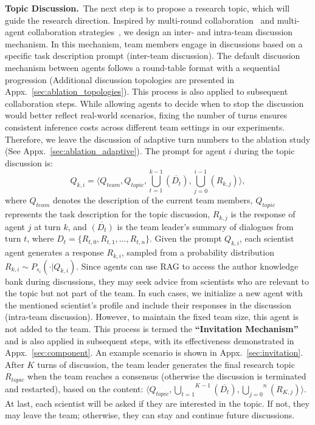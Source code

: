 \documentclass[11pt]{article}
\begin{document}
\noindent \textbf{Topic Discussion.}~The next step is to propose a research topic, which will guide the research direction. Inspired by multi-round collaboration~\citep{mezirow2003critical,sunstein2005societies,amgoud2009using} and multi-agent collaboration strategies~\citep{xu2023magic,zhang2023exploring,shinn2024reflexion}, we design an inter- and intra-team discussion mechanism. In this mechanism, team members engage in discussions based on a specific task description prompt (inter-team discussion). The default discussion mechanism between agents follows a round-table format with a sequential progression (Additional discussion topologies are presented in Appx.~\ref{sec:ablation_topologies}). This process is also applied to subsequent collaboration steps. While allowing agents to decide when to stop the discussion would better reflect real-world scenarios, fixing the number of turns ensures consistent inference costs across different team settings in our experiments. Therefore, we leave the discussion of adaptive turn numbers to the ablation study (See Appx.~\ref{sec:ablation_adaptive}).
The prompt for agent $i$ during the topic discussion is:
\begin{equation} 
    Q_{k,i}=\langle Q_{team},Q_{topic},\overset{k-1}{\underset{t=1}{\bigcup}}(\overline{D_{t}}),\overset{i-1}{\underset{j=0}{\bigcup}}(R_{k,j})\rangle,
\end{equation}
where $Q_{team}$ denotes the description of the current team members, $Q_{topic}$ represents the task description for the topic discussion, $R_{k,j}$ is the response of agent $j$ at turn $k$, and $\overline{(D_{t})}$ is the team leader's summary of dialogues from turn $t$, where $D_{t}=\{R_{t,0},R_{t,1},\dots,R_{t,n}\}$. 
Given the prompt $Q_{k,i}$, each scientist agent generates a response $R_{k,i}$, sampled from a probability distribution $R_{k,i} \sim P_{s_{i}}(\cdot|Q_{k,i})$.
Since agents can use RAG to access the author knowledge bank during discussions, they may seek advice from scientists who are relevant to the topic but not part of the team. In such cases, we initialize a new agent with the mentioned scientist's profile and include their responses in the discussion (intra-team discussion). However, to maintain the fixed team size, this agent is not added to the team. This process is termed the \textbf{``Invitation Mechanism''} and is also applied in subsequent steps, with its effectiveness demonstrated in Appx.~\ref{sec:component}. An example scenario is shown in Appx.~\ref{sec:invitation}. 
After $K$ turns of discussion, the team leader generates the final research topic $R_{topic}$ when the team reaches a consensus (otherwise the discussion is terminated and restarted), based on the content: $\langle Q_{topic}, \overset{K-1}{\underset{t=1}{\bigcup}}(\overline{D_{t}}), \overset{n}{\underset{j=0}{\bigcup}}(R_{K,j})\rangle$. At last, each scientist will be asked if they are interested in the topic. If not, they may leave the team; otherwise, they can stay and continue future discussions.
\end{document}
